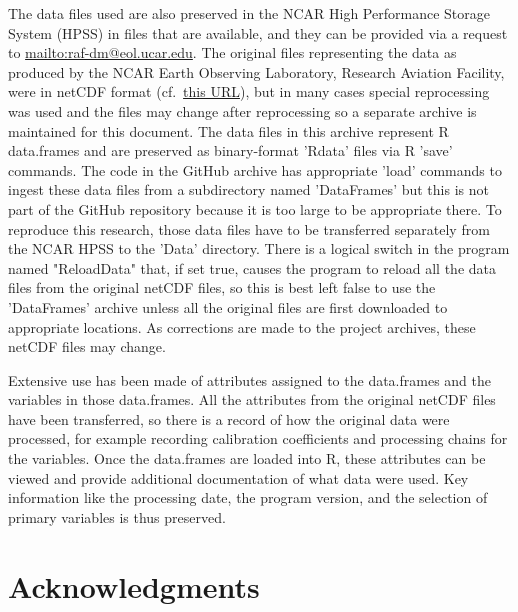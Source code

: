\documentclass[12pt,twoside,english]{article}\usepackage[]{graphicx}\usepackage[]{color}
\let\stdsection\section
\renewcommand{\section}{\newpage\stdsection}
\let\OrgIndex\index
\renewcommand*{\index}[1]{\OrgIndex{#1}}
\begin{document}
The data files used are also preserved in the NCAR High Performance
Storage System (HPSS) in files that are available, and they can be
provided via a request to \url{mailto:raf-dm@eol.ucar.edu}.
The original files representing the data as produced by the NCAR Earth
Observing Laboratory, Research Aviation Facility, were in netCDF format
(cf.~\href{http://www.unidata.ucar.edu/software/netcdf/}{this URL}),
but in many cases special reprocessing was used and the files may
change after reprocessing so a separate archive is maintained for
this document. The data files in this archive represent R data.frames
and are preserved as binary-format 'Rdata' files via R 'save' commands.
The code in the GitHub archive has appropriate 'load' commands to
ingest these data files from a subdirectory named 'DataFrames' but this
is not part of the GitHub repository because it is too large to be
appropriate there. To reproduce this research, those data files have
to be transferred separately from the NCAR HPSS to the 'Data' directory. 
There is a logical switch in the program named "ReloadData" that, if set true,
causes the program to reload all the data files from the original netCDF
files, so this is best left false to use the 'DataFrames' archive unless
all the original files are first downloaded to appropriate locations. As
corrections are made to the project archives, these netCDF files may change.

Extensive use has been made of attributes assigned to the data.frames
and the variables in those data.frames. All the attributes from the
original netCDF files have been transferred, so there is a record
of how the original data were processed, for example recording%
 calibration
coefficients and processing chains for the variables. Once the data.frames
are loaded into R, these attributes can be viewed and provide additional
documentation of what data were used. Key information like the processing
date, the program version, and the selection of primary variables
is thus preserved.




\section*{Acknowledgments}
\label{sec:acknowledgements}
\end{document}
